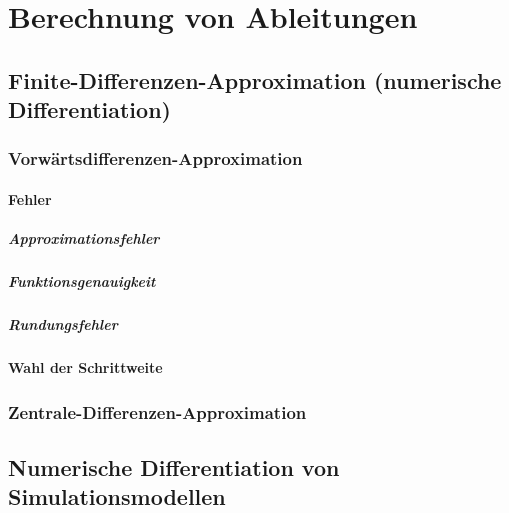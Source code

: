 \chapter{Berechnung von Ableitungen} %

	\section{Finite-Differenzen-Approximation (numerische Differentiation)} %

		\subsection{Vorwärtsdifferenzen-Approximation} %

			\subsubsection{Fehler} %

				\paragraph{Approximationsfehler} %

				\paragraph{Funktionsgenauigkeit} %

				\paragraph{Rundungsfehler} %

			\subsubsection{Wahl der Schrittweite} %

		\subsection{Zentrale-Differenzen-Approximation} %

	\section{Numerische Differentiation von Simulationsmodellen} %

